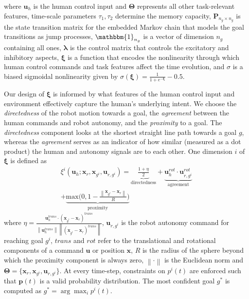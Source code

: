 \documentclass[journal]{IEEEtran}
\newcommand{\argmax}{\arg\!\max}
\newcommand{\norm}[1]{\left\lVert#1\right\rVert}
\begin{document}
where $\boldsymbol{u}_h$ is the human control input and $\boldsymbol{\Theta}$ represents all other task-relevant features, time-scale parameters $\tau_1, \tau_2$ determine the memory capacity, $\boldsymbol{P}_{n_g\times n_g}$ is the state transition matrix for the embedded Markov chain that models the goal transitions as jump processes, $\mathbbm{1}_{n_g}$ is a vector of dimension $n_g$ containing all ones, $\boldsymbol{\lambda}$ is the control matrix that controls the excitatory and inhibitory aspects, $\boldsymbol{\xi}$ is a function that encodes the nonlinearity through which human control commands and task features affect the time evolution, and $\sigma$ is a biased sigmoidal nonlinearity given by $\sigma(\boldsymbol{\xi}) = \frac{1}{1 + e^{-\boldsymbol{\xi}}} - 0.5$. 


Our design of $\boldsymbol{\xi}$ is informed by what features of the human control input and environment effectively capture the human's underlying intent. We choose the \textit{directedness} of the robot motion towards a goal, the \textit{agreement} between the human commands and robot autonomy, and the \textit{proximity} to a goal. The \textit{directedness} component looks at the shortest straight line path towards a goal $g$, whereas the \textit{agreement} serves as an indicator of how similar (measured as a dot product) the human and autonomy signals are to each other.
 One dimension $i$ of $\boldsymbol{\xi}$ is defined as 
\begin{multline*}
\xi^i(\boldsymbol{u}_h;\boldsymbol{x}_r, \boldsymbol{x}_{g^i}, \boldsymbol{u}_{r, g^i}) = \underbrace{\frac{1 + \eta}{2}}_{\text{directedness}} + \underbrace{\boldsymbol{u}_{h}^{rot}\cdot\boldsymbol{u}_{r,g^i}^{rot}}_{\text{agreement}}
\\+ \underbrace{\text{max}\Big(0, 1-\frac{\norm{\boldsymbol{x}_{g^i} - \boldsymbol{x}_r}}{R}\Big)}_{\text{proximity}}
\end{multline*}
where  $\eta = \frac{\boldsymbol{u}_h^{trans}\cdot(\boldsymbol{x}_{g^i} - \boldsymbol{x}_r)^{trans}}{\norm{\boldsymbol{u}_h^{trans}}\norm{(\boldsymbol{x}_{g^i} - \boldsymbol{x}_r)^{trans}}}$, $\boldsymbol{u}_{r,g^i}$ is the robot autonomy command for reaching goal $g^i$, $trans$ and $rot$ refer to the translational and rotational components of a command $\boldsymbol{u}$ or position $\boldsymbol{x}$,  $R$ is the radius of the sphere beyond which the proximity component is always zero, $\norm{\cdot}$ is the Euclidean norm and $\boldsymbol{\Theta} = \{\boldsymbol{x}_r, \boldsymbol{x}_{g^i}, \boldsymbol{u}_{r, g^i}\}$.
At every time-step, constraints on $p^i(t)$ are enforced such that $\boldsymbol{p}(t)$ is a valid probability distribution. 
The most confident goal $g^*$ is computed as $g^* = \argmax_i  p^i(t)$.
\end{document}
